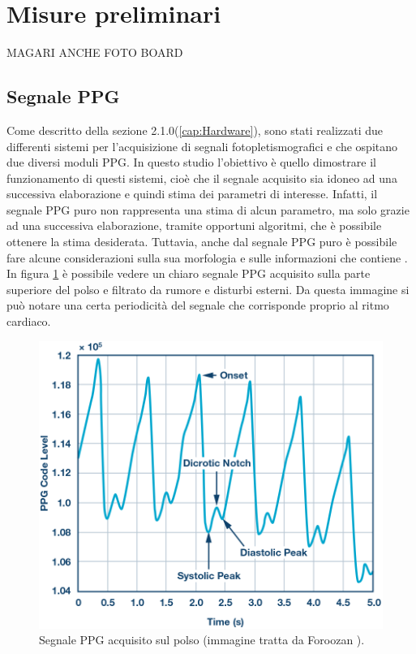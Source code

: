 \section{Misure preliminari}
 MAGARI ANCHE FOTO BOARD
\subsection{Segnale PPG}
Come descritto della sezione 2.1.0(\ref{cap:Hardware}), sono stati realizzati due differenti sistemi per l'acquisizione di segnali fotopletismografici e che ospitano due diversi moduli PPG. In questo studio l'obiettivo è quello dimostrare il funzionamento di questi sistemi, cioè che il segnale acquisito sia idoneo ad una successiva elaborazione e quindi stima dei parametri di interesse. Infatti, il segnale PPG puro non rappresenta una stima di alcun parametro, ma solo grazie ad una successiva elaborazione, tramite opportuni algoritmi, che è possibile ottenere la stima desiderata.
Tuttavia, anche dal segnale PPG puro è possibile fare alcune considerazioni sulla sua morfologia e sulle informazioni che contiene \cite{Foroozan2018}. In figura \ref{fig:Descrizione_Segnale_PPG} è possibile vedere un chiaro segnale PPG acquisito sulla parte superiore del polso e filtrato da rumore e disturbi esterni. Da questa immagine si può notare una certa periodicità del segnale che corrisponde proprio al ritmo cardiaco.
\begin{figure}[h]
	\centering
	\includegraphics[width=0.8\linewidth]{ImageFiles/Misure Preliminari/descrizione_segnale_ppg}
	\caption{Segnale PPG acquisito sul polso (immagine tratta da Foroozan \cite{Foroozan2018}).}
	\label{fig:Descrizione_Segnale_PPG}
\end{figure}
